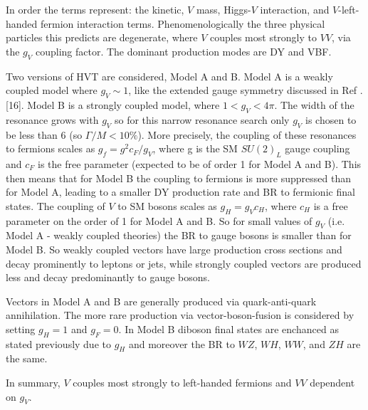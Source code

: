 In order the terms represent: the kinetic, $V$ mass, Higgs-$V$ interaction, and $V$-left-handed fermion interaction terms. Phenomenologically the three physical particles this predicts are degenerate, where $V$ couples most strongly to $VV$, via the $g_{V}$ coupling factor. The dominant production modes are DY and VBF. 

Two versions of HVT are considered, Model A and B. Model A is  a weakly coupled model where $g_{V} \sim 1$, like the extended gauge symmetry discussed in Ref . [16]. Model B is a strongly coupled model, where $1<g_{V}<4\pi$. The width of the resonance grows with $g_{V}$ so for this narrow resonance search only $g_{V}$ is chosen to be less than 6 (so $\Gamma / M < 10\%$). More precisely, the coupling of these resonances to fermions scales as $g_{f} = g^{2}c_{F}/g_{V}$, where g is the SM $SU(2)_{L}$ gauge coupling and $c_{F}$ is the free parameter (expected to be of order 1 for Model A and B). This then means that for Model B the coupling to fermions is more suppressed than for Model A, leading to a smaller DY production rate and BR to fermionic final states. The coupling of $V$ to SM bosons scales as $g_{H}=g_{V}c_{H}$, where $c_{H}$ is a free parameter on the order of 1 for Model A and B. So for small values of $g_{V}$ (i.e. Model A - weakly coupled theories) the BR to gauge bosons is smaller than for Model B. So weakly coupled vectors have large production cross sections and decay prominently to leptons or jets, while strongly coupled vectors are produced less and decay predominantly to gauge bosons. 

Vectors in Model A and B are generally produced via quark-anti-quark annihilation. The more rare production via vector-boson-fusion is considered by setting $g_{H} = 1$ and $g_{F}=0$. In Model B diboson final states are enchanced as stated previously due to $g_{H}$ and moreover the BR to $WZ$, $WH$, $WW$, and $ZH$ are the same.

In summary, $V$ couples most strongly to left-handed fermions and $VV$ dependent on $g_{V}$. 
